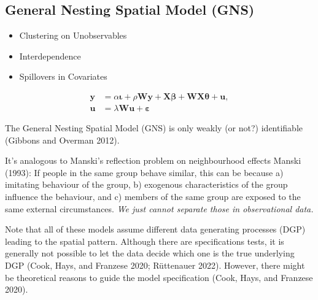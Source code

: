 \documentclass[
  letterpaper,
]{scrbook}
\providecommand{\tightlist}{%
  \setlength{\itemsep}{0pt}\setlength{\parskip}{0pt}}\usepackage{longtable,booktabs,array}
\begin{document}
\hypertarget{general-nesting-spatial-model-gns}{%
\subsection{General Nesting Spatial Model
(GNS)}\label{general-nesting-spatial-model-gns}}

\begin{itemize}
\tightlist
\item
  Clustering on Unobservables
\item
  Interdependence
\item
  Spillovers in Covariates
\end{itemize}

\[
        \begin{split}
        {\boldsymbol{\mathbf{y}}}&=\alpha{\boldsymbol{\mathbf{\iota}}}+\rho{\boldsymbol{\mathbf{W}}}{\boldsymbol{\mathbf{y}}}+{\boldsymbol{\mathbf{X}}}{\boldsymbol{\mathbf{\beta}}}+{\boldsymbol{\mathbf{W}}}{\boldsymbol{\mathbf{X}}}{\boldsymbol{\mathbf{\theta}}}+ {\boldsymbol{\mathbf{u}}},\\
        {\boldsymbol{\mathbf{u}}}&=\lambda{\boldsymbol{\mathbf{W}}}{\boldsymbol{\mathbf{u}}}+{\boldsymbol{\mathbf{\varepsilon}}}
        \end{split}
\]

\begin{tcolorbox}[enhanced jigsaw, colframe=quarto-callout-tip-color-frame, coltitle=black, titlerule=0mm, opacitybacktitle=0.6, toprule=.15mm, colbacktitle=quarto-callout-tip-color!10!white, toptitle=1mm, leftrule=.75mm, colback=white, bottomtitle=1mm, opacityback=0, left=2mm, title=\textcolor{quarto-callout-tip-color}{\faLightbulb}\hspace{0.5em}{Manski's reflection problem}, breakable, arc=.35mm, rightrule=.15mm, bottomrule=.15mm]

The General Nesting Spatial Model (GNS) is only weakly (or not?)
identifiable (Gibbons and Overman 2012).

It's analogous to Manski's reflection problem on neighbourhood effects
Manski (1993): If people in the same group behave similar, this can be
because a) imitating behaviour of the group, b) exogenous
characteristics of the group influence the behaviour, and c) members of
the same group are exposed to the same external circumstances. \emph{We
just cannot separate those in observational data.}

\end{tcolorbox}

Note that all of these models assume different data generating processes
(DGP) leading to the spatial pattern. Although there are specifications
tests, it is generally not possible to let the data decide which one is
the true underlying DGP (Cook, Hays, and Franzese 2020; Rüttenauer
2022). However, there might be theoretical reasons to guide the model
specification (Cook, Hays, and Franzese 2020).
\end{document}
